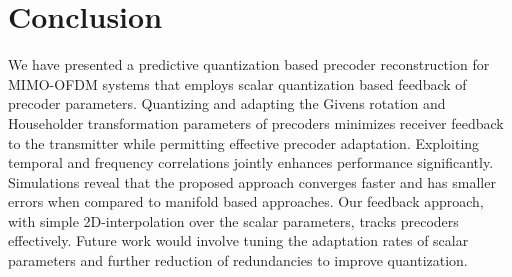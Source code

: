 \documentclass[journal,10pt,twocolumn]{IEEEtran}
\begin{document}


\vspace{-1\baselineskip}
\section{Conclusion}
\label{section4}
We have presented a predictive quantization based precoder
reconstruction for MIMO-OFDM systems that employs scalar quantization
based feedback of precoder parameters. Quantizing and adapting the
Givens rotation and Householder transformation parameters of precoders
minimizes receiver feedback to the transmitter while permitting
effective precoder adaptation. Exploiting temporal and frequency
correlations jointly enhances performance significantly. Simulations
reveal that the proposed approach converges faster and has smaller
errors when compared to manifold based approaches. Our feedback
approach, with simple 2D-interpolation over the scalar parameters,
tracks precoders effectively. Future work would involve tuning the
adaptation rates of scalar parameters and further reduction of
redundancies to improve quantization.


\vspace{-10pt}











\renewcommand{\bibfont}{\footnotesize}




\end{document}
